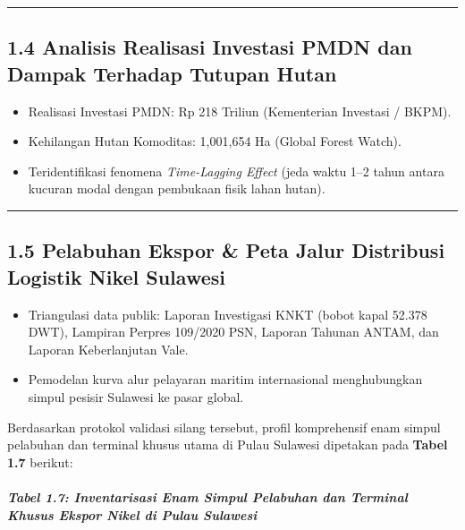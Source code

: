 \documentclass[
]{article}
\providecommand{\tightlist}{%
  \setlength{\itemsep}{0pt}\setlength{\parskip}{0pt}}
\begin{document}
\begin{center}\rule{0.5\linewidth}{0.5pt}\end{center}

\subsection{1.4 Analisis Realisasi Investasi PMDN dan Dampak Terhadap
Tutupan
Hutan}\label{analisis-realisasi-investasi-pmdn-dan-dampak-terhadap-tutupan-hutan}

\begin{itemize}
\tightlist
\item
  Realisasi Investasi PMDN: Rp 218 Triliun (Kementerian Investasi /
  BKPM).
\item
  Kehilangan Hutan Komoditas: 1,001,654 Ha (Global Forest Watch).
\item
  Teridentifikasi fenomena \emph{Time-Lagging Effect} (jeda waktu 1--2
  tahun antara kucuran modal dengan pembukaan fisik lahan hutan).
\end{itemize}

\begin{center}\rule{0.5\linewidth}{0.5pt}\end{center}

\subsection{1.5 Pelabuhan Ekspor \& Peta Jalur Distribusi Logistik Nikel
Sulawesi}\label{pelabuhan-ekspor-peta-jalur-distribusi-logistik-nikel-sulawesi}

\begin{itemize}
\tightlist
\item
  Triangulasi data publik: Laporan Investigasi KNKT (bobot kapal 52.378
  DWT), Lampiran Perpres 109/2020 PSN, Laporan Tahunan ANTAM, dan
  Laporan Keberlanjutan Vale.
\item
  Pemodelan kurva alur pelayaran maritim internasional menghubungkan
  simpul pesisir Sulawesi ke pasar global.
\end{itemize}

Berdasarkan protokol validasi silang tersebut, profil komprehensif enam
simpul pelabuhan dan terminal khusus utama di Pulau Sulawesi dipetakan
pada \textbf{Tabel 1.7} berikut:

\subparagraph{Tabel 1.7: Inventarisasi Enam Simpul Pelabuhan dan
Terminal Khusus Ekspor Nikel di Pulau
Sulawesi}\label{tabel-1.7-inventarisasi-enam-simpul-pelabuhan-dan-terminal-khusus-ekspor-nikel-di-pulau-sulawesi}
\end{document}
